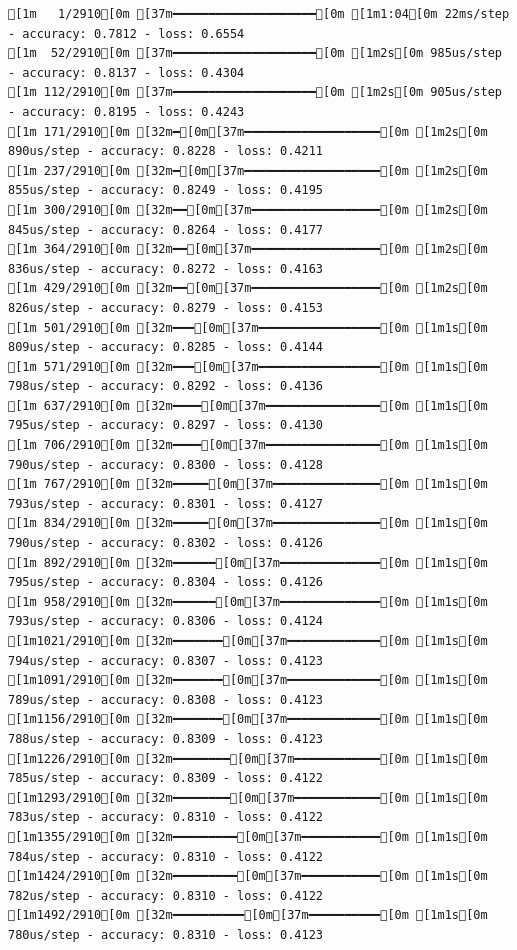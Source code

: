 \documentclass[
  letterpaper,
  DIV=11,
  numbers=noendperiod]{scrartcl}
\begin{document}
\begin{verbatim}
[1m   1/2910[0m [37m━━━━━━━━━━━━━━━━━━━━[0m [1m1:04[0m 22ms/step - accuracy: 0.7812 - loss: 0.6554
[1m  52/2910[0m [37m━━━━━━━━━━━━━━━━━━━━[0m [1m2s[0m 985us/step - accuracy: 0.8137 - loss: 0.4304 
[1m 112/2910[0m [37m━━━━━━━━━━━━━━━━━━━━[0m [1m2s[0m 905us/step - accuracy: 0.8195 - loss: 0.4243
[1m 171/2910[0m [32m━[0m[37m━━━━━━━━━━━━━━━━━━━[0m [1m2s[0m 890us/step - accuracy: 0.8228 - loss: 0.4211
[1m 237/2910[0m [32m━[0m[37m━━━━━━━━━━━━━━━━━━━[0m [1m2s[0m 855us/step - accuracy: 0.8249 - loss: 0.4195
[1m 300/2910[0m [32m━━[0m[37m━━━━━━━━━━━━━━━━━━[0m [1m2s[0m 845us/step - accuracy: 0.8264 - loss: 0.4177
[1m 364/2910[0m [32m━━[0m[37m━━━━━━━━━━━━━━━━━━[0m [1m2s[0m 836us/step - accuracy: 0.8272 - loss: 0.4163
[1m 429/2910[0m [32m━━[0m[37m━━━━━━━━━━━━━━━━━━[0m [1m2s[0m 826us/step - accuracy: 0.8279 - loss: 0.4153
[1m 501/2910[0m [32m━━━[0m[37m━━━━━━━━━━━━━━━━━[0m [1m1s[0m 809us/step - accuracy: 0.8285 - loss: 0.4144
[1m 571/2910[0m [32m━━━[0m[37m━━━━━━━━━━━━━━━━━[0m [1m1s[0m 798us/step - accuracy: 0.8292 - loss: 0.4136
[1m 637/2910[0m [32m━━━━[0m[37m━━━━━━━━━━━━━━━━[0m [1m1s[0m 795us/step - accuracy: 0.8297 - loss: 0.4130
[1m 706/2910[0m [32m━━━━[0m[37m━━━━━━━━━━━━━━━━[0m [1m1s[0m 790us/step - accuracy: 0.8300 - loss: 0.4128
[1m 767/2910[0m [32m━━━━━[0m[37m━━━━━━━━━━━━━━━[0m [1m1s[0m 793us/step - accuracy: 0.8301 - loss: 0.4127
[1m 834/2910[0m [32m━━━━━[0m[37m━━━━━━━━━━━━━━━[0m [1m1s[0m 790us/step - accuracy: 0.8302 - loss: 0.4126
[1m 892/2910[0m [32m━━━━━━[0m[37m━━━━━━━━━━━━━━[0m [1m1s[0m 795us/step - accuracy: 0.8304 - loss: 0.4126
[1m 958/2910[0m [32m━━━━━━[0m[37m━━━━━━━━━━━━━━[0m [1m1s[0m 793us/step - accuracy: 0.8306 - loss: 0.4124
[1m1021/2910[0m [32m━━━━━━━[0m[37m━━━━━━━━━━━━━[0m [1m1s[0m 794us/step - accuracy: 0.8307 - loss: 0.4123
[1m1091/2910[0m [32m━━━━━━━[0m[37m━━━━━━━━━━━━━[0m [1m1s[0m 789us/step - accuracy: 0.8308 - loss: 0.4123
[1m1156/2910[0m [32m━━━━━━━[0m[37m━━━━━━━━━━━━━[0m [1m1s[0m 788us/step - accuracy: 0.8309 - loss: 0.4123
[1m1226/2910[0m [32m━━━━━━━━[0m[37m━━━━━━━━━━━━[0m [1m1s[0m 785us/step - accuracy: 0.8309 - loss: 0.4122
[1m1293/2910[0m [32m━━━━━━━━[0m[37m━━━━━━━━━━━━[0m [1m1s[0m 783us/step - accuracy: 0.8310 - loss: 0.4122
[1m1355/2910[0m [32m━━━━━━━━━[0m[37m━━━━━━━━━━━[0m [1m1s[0m 784us/step - accuracy: 0.8310 - loss: 0.4122
[1m1424/2910[0m [32m━━━━━━━━━[0m[37m━━━━━━━━━━━[0m [1m1s[0m 782us/step - accuracy: 0.8310 - loss: 0.4122
[1m1492/2910[0m [32m━━━━━━━━━━[0m[37m━━━━━━━━━━[0m [1m1s[0m 780us/step - accuracy: 0.8310 - loss: 0.4123

\end{verbatim}
\end{document}
